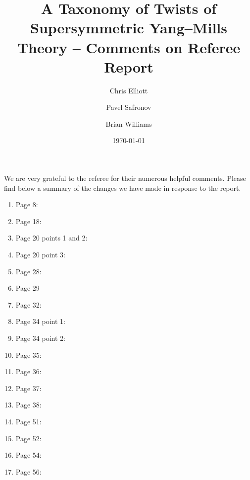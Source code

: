 \documentclass[10pt, oneside]{article}
\title{A Taxonomy of Twists of Supersymmetric Yang--Mills Theory -- Comments on Referee Report}
\author{Chris Elliott\and Pavel Safronov \and Brian Williams}
\date{\today}
\begin{document}
\maketitle

We are very grateful to the referee for their numerous helpful comments.  Please find below a summary of the changes we have made in response to the report.

\begin{enumerate}
 \item Page 8:
 \item Page 18:
 \item Page 20 points 1 and 2:
 \item Page 20 point 3:
 \item Page 28:
 \item Page 29
 \item Page 32:
 \item Page 34 point 1:
 \item Page 34 point 2:
 \item Page 35:
 \item Page 36:
 \item Page 37:
 \item Page 38:
 \item Page 51:
 \item Page 52:
 \item Page 54:
 \item Page 56:
\end{enumerate}

 
\end{document}
